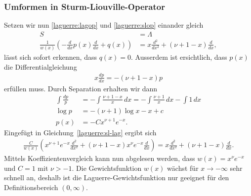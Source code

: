 
\subsubsection{Umformen in Sturm-Liouville-Operator}
Setzen wir nun 
\eqref{laguerre:lagop} und \eqref{laguerre:slop}
einander gleich
\begin{align}
S
 & =
\Lambda
\nonumber
\\
\frac{1}{w(x)} \left(-\frac{d}{dx}p(x) \frac{d}{dx} + q(x) \right)
 & =
x \frac{d^2}{dx^2} + (\nu + 1 - x) \frac{d}{dx}
\label{laguerre:sl-lag}
,
\end{align}
lässt sich sofort erkennen, dass $q(x) = 0$.
Ausserdem ist ersichtlich, dass $p(x)$ die Differentialgleichung
\begin{align*}
x \frac{dp}{dx}
=
-(\nu + 1 - x) p
\end{align*}
erfüllen muss.
Durch Separation erhalten wir dann
\begin{align*}
\int \frac{dp}{p}
 & =
-\int \frac{\nu + 1 - x}{x} \, dx
=
-\int \frac{\nu + 1}{x} \, dx - \int 1\, dx
\\
\log p
 & =
-(\nu + 1)\log x - x + c
\\
p(x)
 & =
-C x^{\nu + 1} e^{-x}
.
\end{align*}
Eingefügt in Gleichung~\eqref{laguerre:sl-lag} ergibt sich
\begin{align*}
\frac{C}{w(x)}
\left(
x^{\nu+1} e^{-x} \frac{d^2}{dx^2} +
(\nu + 1 - x) x^{\nu} e^{-x} \frac{d}{dx}
\right)
=
x \frac{d^2}{dx^2} + (\nu + 1 - x) \frac{d}{dx}.
\end{align*}
Mittels Koeffizientenvergleich kann nun abgelesen werden,
dass $w(x) = x^\nu e^{-x}$ und $C=1$ mit $\nu > -1$.
Die Gewichtsfunktion $w(x)$ wächst für $x\rightarrow-\infty$ sehr schnell an,
deshalb ist die Laguerre-Gewichtsfunktion nur geeignet für den
Definitionsbereich $(0, \infty)$.


